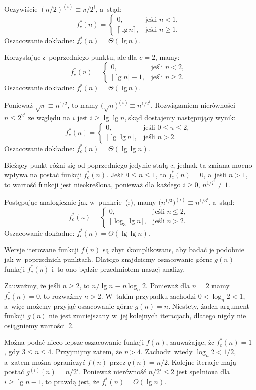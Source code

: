 \subproblem %
Oczywiście $(n/2)^{(i)}\equiv n/2^i$, a~stąd:
\[
	f_c^*(n) =
	\begin{cases}
		0, & \text{jeśli $n<1$}, \\
		\lceil\lg n\rceil, & \text{jeśli $n\ge1$}.
	\end{cases}
\]
Oszacowanie dokładne: $f_c^*(n)=\Theta(\lg n)$.

\subproblem %
Korzystając z~poprzedniego punktu, ale dla $c=2$, mamy:
\[
	f_c^*(n) =
	\begin{cases}
		0, & \text{jeśli $n<2$}, \\
		\lceil\lg n\rceil-1, & \text{jeśli $n\ge2$}.
	\end{cases}
\]
Oszacowanie dokładne: $f_c^*(n)=\Theta(\lg n)$.

\subproblem %
Ponieważ $\sqrt{n}\equiv n^{1/2}$, to mamy $\bigl(\!\sqrt{n}\bigr)^{(i)}\equiv n^{1/2^i}$\!. Rozwiązaniem nierówności $n\le2^{2^i}$ ze względu na $i$ jest $i\ge\lg\lg n$, skąd dostajemy następujący wynik:
\[
	f_c^*(n) =
	\begin{cases}
		0, & \text{jeśli $0\le n\le2$}, \\
		\lceil\lg\lg n\rceil, & \text{jeśli $n>2$}.
	\end{cases}
\]
Oszacowanie dokładne: $f_c^*(n)=\Theta(\lg\lg n)$.

\subproblem %
Bieżący punkt różni się od poprzedniego jedynie stałą $c$, jednak ta zmiana mocno wpływa na postać funkcji $f_c^*(n)$. Jeśli $0\le n\le1$, to $f_c^*(n)=0$, a~jeśli $n>1$, to wartość funkcji jest nieokreślona, ponieważ dla każdego $i\ge0$, $n^{1/2^i}\ne1$.

\subproblem %
Postępując analogicznie jak w~punkcie~(e), mamy $\bigl(n^{1/3}\bigr)^{(i)}\equiv n^{1/3^i}$, a~stąd:
\[
	f_c^*(n) =
	\begin{cases}
		0, & \text{jeśli $n\le2$}, \\
		\lceil\log_3\lg n\rceil, & \text{jeśli $n>2$}.
	\end{cases}
\]
Oszacowanie dokładne: $f_c^*(n)=\Theta(\lg\lg n)$.

\subproblem %
Wersje iterowane funkcji $f(n)$ są zbyt skomplikowane, aby badać je podobnie jak w~poprzednich punktach. Dlatego znajdziemy oszacowanie górne $g(n)$ funkcji $f_c^*(n)$ i~to ono będzie przedmiotem naszej analizy.

Zauważmy, że jeśli $n\ge2$, to $n/\!\lg n\equiv n\log_n\!2$. Ponieważ dla $n=2$ mamy $f_c^*(n)=0$, to rozważmy $n>2$. W~takim przypadku zachodzi $0<\log_n\!2<1$, a~więc możemy przyjąć oszacowanie górne $g(n)=n$. Niestety, żaden argument funkcji $g(n)$ nie jest zmniejszany w~jej kolejnych iteracjach, dlatego nigdy nie osiągniemy wartości~2.

Można podać nieco lepsze oszacowanie funkcji $f(n)$, zauważając, że $f_c^*(n)=1$, gdy $3\le n\le4$. Przyjmijmy zatem, że $n>4$. Zachodzi wtedy $\log_n\!2<1/2$, a~zatem można ograniczyć $f(n)$ przez $g(n)=n/2$. Kolejne iteracje mają postać $g^{(i)}(n)=n/2^i$. Ponieważ nierówność $n/2^i\le2$ jest spełniona dla $i\ge\lg n-1$, to prawdą jest, że $f_c^*(n)=O(\lg n)$.

\endinput
